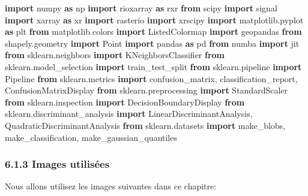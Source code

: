 \documentclass[
]{article}
\newenvironment{Shaded}{}{}
\newcommand{\ImportTok}[1]{\textcolor[rgb]{0.00,0.50,0.00}{\textbf{#1}}}
\newcommand{\NormalTok}[1]{#1}
\begin{document}
\label{1725a255}
\label{cb2}
\begin{Shaded}
\begin{Highlighting}[]
\ImportTok{import}\NormalTok{ numpy }\ImportTok{as}\NormalTok{ np}
\ImportTok{import}\NormalTok{ rioxarray }\ImportTok{as}\NormalTok{ rxr}
\ImportTok{from}\NormalTok{ scipy }\ImportTok{import}\NormalTok{ signal}
\ImportTok{import}\NormalTok{ xarray }\ImportTok{as}\NormalTok{ xr}
\ImportTok{import}\NormalTok{ rasterio}
\ImportTok{import}\NormalTok{ xrscipy}
\ImportTok{import}\NormalTok{ matplotlib.pyplot }\ImportTok{as}\NormalTok{ plt}
\ImportTok{from}\NormalTok{ matplotlib.colors }\ImportTok{import}\NormalTok{ ListedColormap}
\ImportTok{import}\NormalTok{ geopandas}
\ImportTok{from}\NormalTok{ shapely.geometry }\ImportTok{import}\NormalTok{ Point}
\ImportTok{import}\NormalTok{ pandas }\ImportTok{as}\NormalTok{ pd}
\ImportTok{from}\NormalTok{ numba }\ImportTok{import}\NormalTok{ jit}
\ImportTok{from}\NormalTok{ sklearn.neighbors }\ImportTok{import}\NormalTok{ KNeighborsClassifier}
\ImportTok{from}\NormalTok{ sklearn.model\_selection }\ImportTok{import}\NormalTok{ train\_test\_split}
\ImportTok{from}\NormalTok{ sklearn.pipeline }\ImportTok{import}\NormalTok{ Pipeline}
\ImportTok{from}\NormalTok{ sklearn.metrics }\ImportTok{import}\NormalTok{ confusion\_matrix, classification\_report, ConfusionMatrixDisplay}
\ImportTok{from}\NormalTok{ sklearn.preprocessing }\ImportTok{import}\NormalTok{ StandardScaler}
\ImportTok{from}\NormalTok{ sklearn.inspection }\ImportTok{import}\NormalTok{ DecisionBoundaryDisplay}
\ImportTok{from}\NormalTok{ sklearn.discriminant\_analysis }\ImportTok{import}\NormalTok{ LinearDiscriminantAnalysis, QuadraticDiscriminantAnalysis}
\ImportTok{from}\NormalTok{ sklearn.datasets }\ImportTok{import}\NormalTok{ make\_blobs, make\_classification, make\_gaussian\_quantiles}
\end{Highlighting}
\end{Shaded}

\subsubsection{\texorpdfstring{{6.1.3} Images
utilisées}{6.1.3 Images utilisées}}\label{images-utilisuxe9es}

Nous allons utilisez les images suivantes dans ce chapitre:
\end{document}
